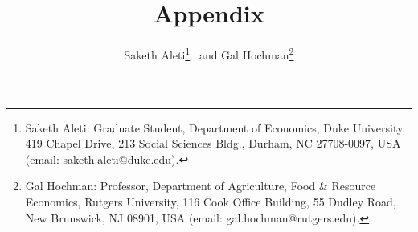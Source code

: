 \documentclass[11pt,a4paper,leqno]{extarticle}
\begin{document}
	
	\title{\\\vspace{1em}
	Appendix}
	
	\author[]{Saketh Aleti\thanks{Saketh Aleti: Graduate Student, Department of Economics, Duke University, 419 Chapel Drive, 213 Social Sciences Bldg., Durham, NC 27708-0097, USA (email: saketh.aleti@duke.edu).}  \, and  Gal Hochman\thanks{ Gal Hochman: Professor, Department of Agriculture, Food \& Resource Economics, Rutgers University, 116 Cook Office Building, 55 Dudley Road, New Brunswick, NJ 08901, USA (email: gal.hochman@rutgers.edu).}}
	
	
	\maketitle
	
%		
%	
	
	
	
	
	
\end{document}
